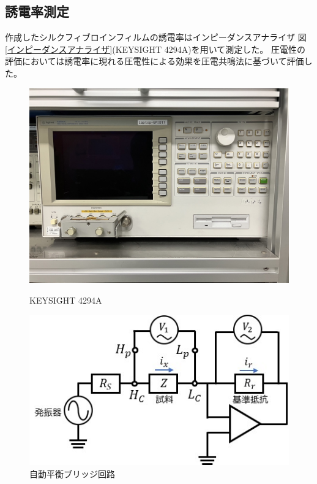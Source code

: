\documentclass[dvipdfmx,12pt,a4paper]{jreport}
\begin{document}
			\subsection{誘電率測定}
			作成したシルクフィブロインフィルムの誘電率はインピーダンスアナライザ
			図\ref{インピーダンスアナライザ}(KEYSIGHT 4294A)を用いて測定した。
			圧電性の評価においては誘電率に現れる圧電性による効果を圧電共鳴法に基づいて評価した。
			\begin{figure}[h]
				\centering
				\begin{minipage}{0.45\hsize}
					\centering
					\includegraphics[width=\linewidth]{4294A.jpg}
					\caption{KEYSIGHT 4294A}
					\label{インピーダンスアナライザ}
				\end{minipage}
				\begin{minipage}{0.45\hsize}
					\centering
					\includegraphics{自動平衡ブリッジ回路.jpg}
					\caption{自動平衡ブリッジ回路}
					\label{自動平衡ブリッジ回路}
				\end{minipage}
			\end{figure}
\end{document}
